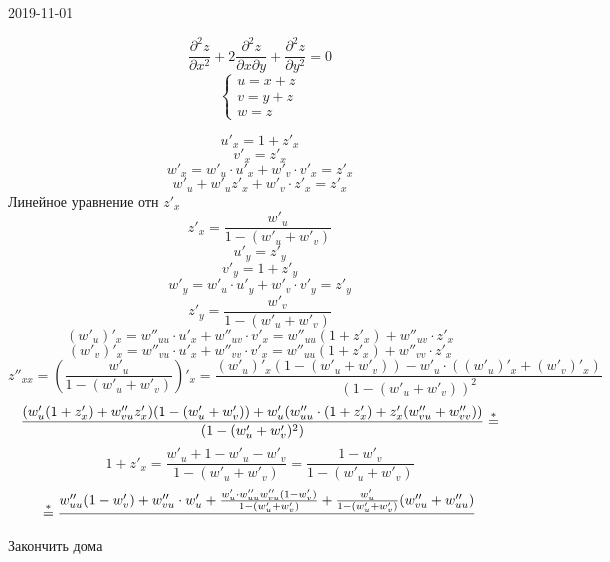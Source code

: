 \documentclass[matan.tex]{subfiles}
\begin{document}
\begin{lect}{2019-11-01}
    \begin{Task} [3507]
        \[\frac{\partial^2 z}{\partial x^2} + 2 \frac{\partial^2 z}{\partial x 
        \partial y} + \frac{\partial^2 z}{\partial y^2} = 0\]
        \[\begin{cases}
            u = x + z\\
            v = y + z\\
            w = z
        \end{cases}\]

        \[u'_x = 1 + z'_x\]
        \[v'_x = z'_x\]
        \[w'_x = w'_u \cdot u'_x + w'_v \cdot v'_x = z'_x\]
        \[w'_u + w'_u z'_x + w'_v \cdot z'_x = z'_x\]
        Линейное уравнение отн $z'_x$
        \[z'_x = \frac{w'_u}{1 - (w'_u + w'_v)}\]
        \[u'_y = z'_y\]
        \[v'_y = 1 + z'_y\]
        \[w'_y = w'_u \cdot u'_y + w'_v \cdot v'_y = z'_y\]
        \[z'_y = \frac{w'_v}{1 - (w'_u + w'_v)}\]
        \[(w'_u)'_x = w''_{uu} \cdot u'_x + w''_{uv} \cdot v'_x = 
        w''_{uu}(1 + z'_x) + w''_{uv} \cdot z'_x   \]
        \[(w'_v)'_x = w''_{vu} \cdot u'_x + w''_{vv} \cdot v'_x = 
        w''_{uu} (1 + z'_x) + w''_{vv} \cdot z'_x  \]
        \[z''_{xx} = \left(\frac{w'_u}{1 - (w'_u + w'_v)}\right)'_x = 
         \frac{(w'_u)'_x(1 -(w'_u + w'_v)) - w'_u \cdot( (w'_u)'_x + (w'_v)'_x)}{(1 -   
        (w'_u + w'_v))^2}\]
        \[\frac{(w'_u(1 + z'_x) + w''_{vu} z'_x)(1 - (w'_u + w'_v)) + w'_u(
        w''_{uu} \cdot (1 + z'_x) + z'_x (w''_{vu} + w''_{vv}  )) }{
        (1 - (w'_u + w'_v)^2)} \overset{*}{=}\]
        \[1 + z'_x = \frac{w'_u + 1 - w'_u - w'_v}{1 - (w'_u + w'_v)} = 
        \frac{1 - w'_v}{1 - (w'_u + w'_v)}\]
        \[\overset{*}{=} \frac{w''_{uu}(1 - w'_v) + w''_{vu} \cdot w'_u + \frac{w'_u \cdot 
                w''_{uu} w''_{vu} (1 - w'_v)  }
        {1 - (w'_u + w'_v)} + \frac{w'_u}{1 - (w'_u + w'_v)}(w''_{vu}  +w''_{uu}  )}{}\]
        Закончить дома
    \end{Task}


\end{lect}
\end{document}

